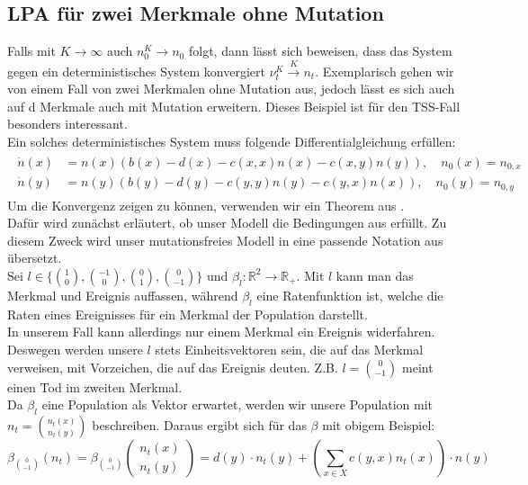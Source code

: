\documentclass[11pt, a4paper, german]{article}
\theoremstyle{plain}
\newcommand{\tvec}[2]{\begin{pmatrix}#1\\#2\end{pmatrix}}
\begin{document}
	\subsection{LPA für zwei Merkmale ohne Mutation}
	Falls mit $ K \to \infty $ auch $ n_0^K \to n_0 $ folgt, dann lässt sich beweisen, dass das System gegen ein deterministisches System konvergiert $ \nu_t^K \xrightarrow{K} n_t $. Exemplarisch gehen wir von einem Fall von zwei Merkmalen ohne Mutation aus, jedoch lässt es sich auch auf d Merkmale auch mit Mutation erweitern. Dieses Beispiel ist für den TSS-Fall besonders interessant.\\
	Ein solches deterministisches System muss folgende Differentialgleichung erfüllen:
	\begin{align}
	\begin{split}
		\dot{n}(x) &= n(x) \left( b(x) - d(x) - c(x,x) n(x) - c(x,y) n(y) \right), \quad n_0(x) = n_{0,x}\\
		\dot{n}(y) &= n(y) \left( b(y) - d(y) - c(y,y) n(y) - c(y,x) n(x) \right), \quad n_0(y) = n_{0,y} \label{Differentialgleichung}
	\end{split}
	\end{align}
	Um die Konvergenz zeigen zu können, verwenden wir ein Theorem aus \cite[Kapitel 11, Thm 2.1]{ethier2009markov}.\\
	Dafür wird zunächst erläutert, ob unser Modell die Bedingungen aus \cite{ethier2009markov} erfüllt. Zu diesem Zweck wird unser mutationsfreies Modell in eine passende Notation aus \cite{ethier2009markov} übersetzt.\\
	Sei $ l \in \{ \binom{1}{0}, \binom{-1}{0}, \binom{0}{1}, \binom{0}{-1} \} $ und $ \beta_l : \mathbb{R}^2 \to \mathbb{R}_+ $. Mit $ l $ kann man das Merkmal und Ereignis auffassen, während $ \beta_l $ eine Ratenfunktion ist, welche die Raten eines Ereignisses für ein Merkmal der Population darstellt.\\
	In unserem Fall kann allerdings nur einem Merkmal ein Ereignis widerfahren. Deswegen werden unsere $ l $ stets Einheitsvektoren sein, die auf das Merkmal verweisen, mit Vorzeichen, die auf das Ereignis deuten. Z.B. $ l = \binom{0}{-1} $ meint einen Tod im zweiten Merkmal.\\
	Da $ \beta_l $ eine Population als Vektor erwartet, werden wir unsere Population mit $ n_t = \binom{n_t(x)}{n_t(y)} $ beschreiben. Daraus ergibt sich für das $ \beta $ mit obigem Beispiel:
	\[ \beta_{\binom{0}{-1}}(n_t)  = \beta_{\binom{0}{-1}}\tvec{n_t(x)}{n_t(y)} = d(y) \cdot n_t(y) + \left(\sum_{x \in X} c(y,x)n_t(x)\right) \cdot n(y) \]
\end{document}
